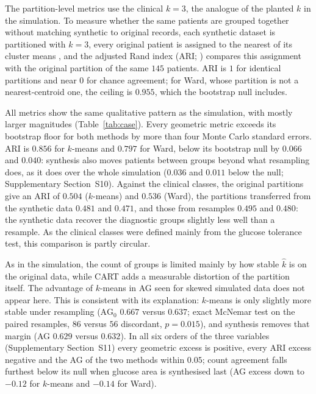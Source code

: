 \documentclass[pdflatex,referee]{sn-jnl}
\begin{document}
The partition-level metrics use the clinical $k = 3$, the analogue of the
planted $k$ in the simulation. To measure whether the same patients are grouped
together without matching synthetic to original records, each synthetic dataset
is partitioned with $k = 3$, every original patient is assigned to the nearest
of its cluster means \citep{dudoit2002,tibshirani2005}, and the adjusted Rand
index (ARI; \citealp{hubert1985}) compares this assignment with the original
partition of the same $145$ patients. ARI is $1$ for identical partitions and
near $0$ for chance agreement; for Ward, whose partition is not a
nearest-centroid one, the ceiling is $0.955$, which the bootstrap null
includes.

All metrics show the same qualitative pattern as the simulation, with mostly
larger magnitudes (Table~\ref{tab:case}). Every geometric metric exceeds its
bootstrap floor for both methods by more than four Monte Carlo standard errors.
ARI is $0.856$ for $k$-means and $0.797$ for Ward, below its bootstrap null by
$0.066$ and $0.040$: synthesis also moves patients between groups beyond what
resampling does, as it does over the whole simulation ($0.036$ and $0.011$
below the null; Supplementary Section~S10). Against the clinical classes, the
original partitions give an ARI of $0.504$ ($k$-means) and $0.536$ (Ward), the
partitions transferred from the synthetic data $0.481$ and $0.471$, and those
from resamples $0.495$ and $0.480$: the synthetic data recover the diagnostic
groups slightly less well than a resample. As the clinical classes were defined
mainly from the glucose tolerance test, this comparison is partly circular.

As in the simulation, the count of groups is limited mainly by how stable
$\hat k$ is on the original data, while CART adds a measurable distortion of
the partition itself. The advantage of $k$-means in AG seen for skewed simulated
data does not appear here. This is consistent with its explanation: $k$-means
is only slightly more stable under resampling ($\mathrm{AG}_0$ $0.667$ versus
$0.637$; exact McNemar test on the paired resamples, $86$ versus $56$
discordant, $p = 0.015$), and synthesis removes that margin (AG $0.629$ versus
$0.632$). In all six orders of the three variables
(Supplementary Section~S11) every geometric excess is positive, every ARI
excess negative and the AG of the two methods within $0.05$; count agreement
falls furthest below its null when glucose area is synthesised last (AG excess
down to $-0.12$ for $k$-means and $-0.14$ for Ward).
\end{document}
